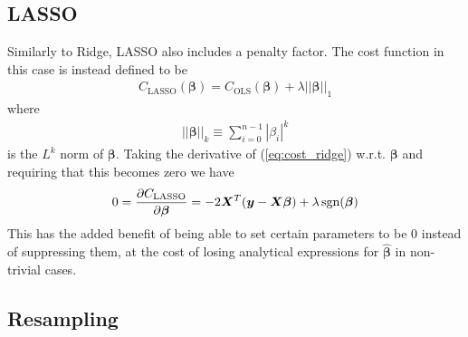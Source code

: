 \documentclass[%
reprint,
amsmath,amssymb,
aps,
pra,
]{revtex4-2}
\begin{document}
\subsection{LASSO}
Similarly to Ridge, LASSO also includes a penalty factor. The cost function in this case is instead defined to be
\begin{align}
	C_\text{LASSO}(\bm\beta)=C_\text{OLS}(\bm\beta)+\lambda||\bm\beta||_1
	\label{eq:cost_ridge}
\end{align}
where
\begin{align*}
	||\bm\beta||_k\equiv\sum_{i=0}^{n-1}|\beta_i|^k
\end{align*}
is the $L^k$ norm of $\bm\beta$. Taking the derivative of (\ref{eq:cost_ridge}) w.r.t. $\bm \beta$ and requiring that this becomes zero we have
\begin{align}
	0=\pdv{C_\text{LASSO}}{\bm\beta}=-2\bm X^T(\bm y-\bm X\bm\beta)+\lambda\,\text{sgn}(\bm\beta)
\end{align}
This has the added benefit of being able to set certain parameters to be $0$ instead of suppressing them, at the cost of losing analytical expressions for $\hat{\bm\beta}$ in non-trivial cases.

\subsection{Resampling}
\end{document}

